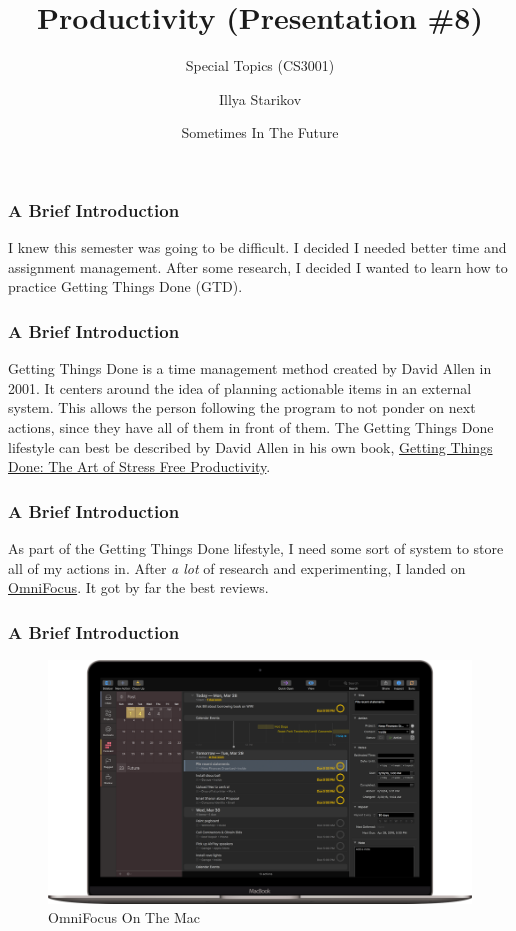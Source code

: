 \documentclass[xclolor=dvipsnames]{beamer}            %
\title{Productivity (Presentation \#8)}
\subtitle{Special Topics (CS3001)}
\author{Illya Starikov}
\date{Sometimes In The Future}
\institute{Missouri University of Science and Technology}
\begin{document}
\begin{darkframes}
    \maketitle

    \begin{frame}
        \frametitle{A Brief Introduction}

        I knew this semester was going to be difficult. I decided I needed better time and assignment management. After some research, I decided I wanted to learn how to practice Getting Things Done (GTD).
    \end{frame}

    \begin{frame}
        \frametitle{A Brief Introduction}

        Getting Things Done is a time management method created by David Allen in 2001. It centers around the idea of planning actionable items in an external system. This allows the person following the program to not ponder on next actions, since they have all of them in front of them. The Getting Things Done lifestyle can best be described by David Allen in his own book, \href{https://www.amazon.com/Getting-Things-Done-Stress-Free-Productivity/dp/0142000280}{Getting Things Done: The Art of Stress Free Productivity}.
    \end{frame}

    \begin{frame}
        \frametitle{A Brief Introduction}

        As part of the Getting Things Done lifestyle, I need some sort of system to store all of my actions in. After \textit{a lot} of research and experimenting, I landed on \href{https://www.omnigroup.com/omnifocus}{OmniFocus}. It got by far the best reviews.
    \end{frame}

    \begin{frame}
        \frametitle{A Brief Introduction}

        \begin{figure}[H]
            \centering
            \includegraphics[width=.9\linewidth]{assets/omnifocus.png}
            \caption{OmniFocus On The Mac}
            \label{fig:OmniFocus}
        \end{figure}


\end{frame}
\end{darkframes}
\end{document}
